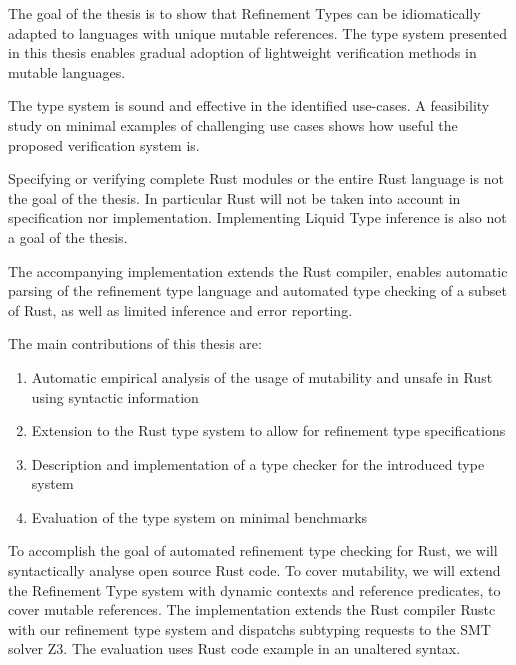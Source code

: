 \documentclass[twoside, english]{sdqthesis}
\theoremstyle{definition}
\begin{document}
The goal of the thesis is to show that Refinement Types can be idiomatically adapted to languages with unique mutable references. The type system presented in this thesis enables gradual adoption of lightweight verification methods in mutable languages.

The type system is sound and effective in the identified use-cases.
A feasibility study on minimal examples of challenging use cases shows how useful the proposed verification system is. 

Specifying or verifying complete Rust modules or the entire Rust language is not the goal of the thesis. In particular  Rust will not be taken into account in specification nor implementation. Implementing Liquid Type inference is also not a goal of the thesis.

The accompanying implementation extends the Rust compiler, enables automatic parsing of the refinement type language and automated type checking of a subset of Rust, as well as limited inference and error reporting. 

The main contributions of this thesis are:
\begin{enumerate}
  \item Automatic empirical analysis of the usage of mutability and unsafe in Rust using syntactic information
  \item Extension to the Rust type system to allow for refinement type specifications
  \item Description and implementation of a type checker for the introduced type system
  \item Evaluation of the type system on minimal benchmarks
\end{enumerate}

To accomplish the goal of automated refinement type checking for Rust, we will syntactically analyse open source Rust code.
To cover mutability, we will extend the Refinement Type system with dynamic contexts and reference predicates, to cover mutable references. The implementation extends the Rust compiler Rustc with our refinement type system and dispatchs subtyping requests to the SMT solver Z3. 
The evaluation uses Rust code example in an unaltered syntax.
\end{document}
